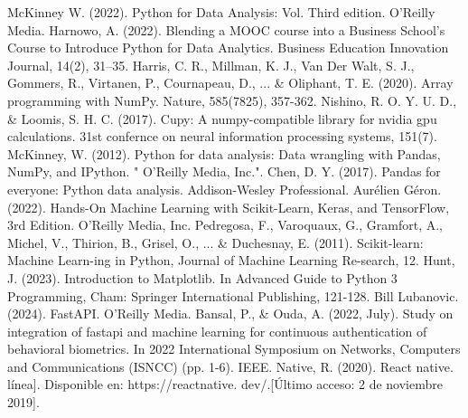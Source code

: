 \documentclass[12pt,a4paper]{article}
\begin{document}
\begin{enumerate}
\begin{thebibliography}{99}
 McKinney W. (2022). Python for Data Analysis: Vol. Third edition. O’Reilly Media.
 Harnowo, A. (2022). Blending a MOOC course into a Business School’s Course to Introduce Python for Data Analytics. Business Education Innovation Journal, 14(2), 31–35.
 Harris, C. R., Millman, K. J., Van Der Walt, S. J., Gommers, R., Virtanen, P., Cournapeau, D., ... \& Oliphant, T. E. (2020). Array programming with NumPy. Nature, 585(7825), 357-362.
 Nishino, R. O. Y. U. D., \& Loomis, S. H. C. (2017). Cupy: A numpy-compatible library for nvidia gpu calculations. 31st confernce on neural information processing systems, 151(7).
 McKinney, W. (2012). Python for data analysis: Data wrangling with Pandas, NumPy, and IPython. " O'Reilly Media, Inc.".
 Chen, D. Y. (2017). Pandas for everyone: Python data analysis. Addison-Wesley Professional.
 Aurélien Géron. (2022). Hands-On Machine Learning with Scikit-Learn, Keras, and TensorFlow, 3rd Edition. O’Reilly Media, Inc.
 Pedregosa, F., Varoquaux, G., Gramfort, A., Michel, V., Thirion, B., Grisel, O., ... \& Duchesnay, E. (2011). Scikit-learn: Machine Learn-ing in Python, Journal of Machine Learning Re-search, 12.
 Hunt, J. (2023). Introduction to Matplotlib. In Advanced Guide to Python 3 Programming, Cham: Springer International Publishing, 121-128.
 Bill Lubanovic. (2024). FastAPI. O’Reilly Media.
 Bansal, P., \& Ouda, A. (2022, July). Study on integration of fastapi and machine learning for continuous authentication of behavioral biometrics. In 2022 International Symposium on Networks, Computers and Communications (ISNCC) (pp. 1-6). IEEE.
 Native, R. (2020). React native. línea]. Disponible en: https://reactnative. dev/.[Último acceso: 2 de noviembre 2019].
\end{thebibliography}

\end{enumerate}	

\label{LastPage}
\end{document}
